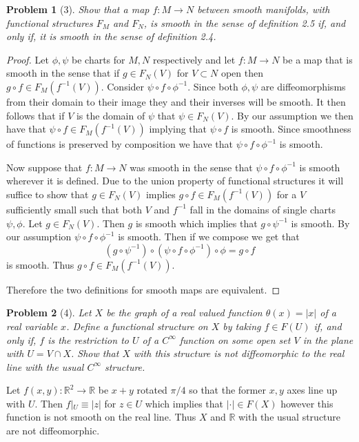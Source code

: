 \documentclass[10pt]{article}
\newcommand{\sk}{\vskip 10mm}
\newcommand{\bb}[1]{\mathbb{#1}}
\theoremstyle{plain}
\newtheorem{problem}{Problem}
\theoremstyle{remark}
\begin{document}
\sk

\begin{problem}[3]
  Show that a map $f:M\rightarrow N$ between smooth manifolds, with functional
  structures $F_M$ and $F_N$, is smooth in the sense of definition 2.5
  if, and only if, it is smooth in the sense of definition 2.4.
\end{problem}

\begin{proof}
  Let $\phi,\psi$ be charts for $M,N$ respectively and let $f:M\rightarrow N$ be a map that
  is smooth in the sense that if $g\in F_N(V)$ for $V\subset N$ open then
  $g\circ f\in F_M(f^{-1}(V))$. Consider $\psi\circ f\circ \phi^{-1}$. Since both $\phi,\psi$ are diffeomorphisms
  from their domain to their image they and their inverses will be smooth. It then
  follows that if $V$ is the domain of $\psi$ that $\psi\in F_N(V)$. By
  our assumption we then have that $\psi\circ f\in F_M(f^{-1}(V))$ implying that
  $\psi\circ f$ is smooth. Since smoothness of functions is preserved by composition
  we have that $\psi\circ f\circ\phi^{-1}$ is smooth.

  Now suppose that $f:M\rightarrow N$ was smooth in the sense that $\psi\circ f\circ \phi^{-1}$ is smooth
  wherever it is defined. Due to the union property of functional structures
  it will suffice to show that $g\in F_N(V)$ implies $g\circ f\in F_M(f^{-1}(V))$
  for a $V$ sufficiently small such that both $V$ and $f^{-1}$ fall in the
  domains of single charts $\psi,\phi$. Let $g\in F_N(V)$. Then $g$ is smooth
  which implies that $g\circ\psi^{-1}$ is smooth. By our assumption
  $\psi\circ f\circ \phi^{-1}$ is smooth. Then if we compose we get that
  \[ (g\circ\psi^{-1})\circ(\psi\circ f\circ\phi^{-1})\circ\phi =g\circ f\]
  is smooth. Thus $g\circ f\in F_M(f^{-1}(V))$.

  Therefore the two definitions for smooth maps are equivalent.
\end{proof}

\sk

\begin{problem}[4]
  Let $X$ be the graph of a real valued function $\theta(x)=|x|$ of a real
  variable $x$. Define a functional structure on $X$ by taking $f\in F(U)$
  if, and only if, $f$ is the restriction to $U$ of a $C^\infty$ function on some
  open set $V$ in the plane with $U=V\cap X$. Show that $X$ with this structure
  is \textit{not} diffeomorphic to the real line with the usual $C^\infty$ structure.
\end{problem}

Let $f(x,y):\bb{R}^2\rightarrow \bb{R}$ be $x+y$ rotated $\pi/4$ so that the former $x,y$ axes
line up with $U$. Then $f|_U\equiv |z|$ for $z\in U$ which implies that $|\cdot|\in F(X)$ however
this function is not smooth on the real line. Thus $X$ and $\bb{R}$ with the usual
structure are not diffeomorphic.

\sk

\end{document}
